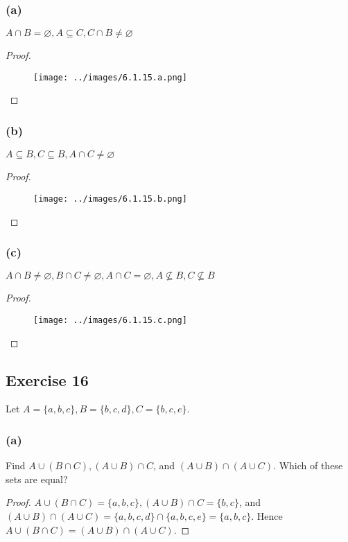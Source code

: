 \documentclass[14pt]{extarticle}
\newcommand{\es}{\varnothing}
\begin{document}
\subsubsection{(a)}
\(A \cap B = \es, A \subseteq C, C \cap B \neq \es\)

\begin{proof}
  \begin{figure}[ht!]
    \centering
    \texttt{[image: ../images/6.1.15.a.png]}
  \end{figure}
\end{proof}

\subsubsection{(b)}
\(A \subseteq B, C \subseteq B, A \cap C \neq \es\)

\begin{proof}
  \begin{figure}[ht!]
    \centering
    \texttt{[image: ../images/6.1.15.b.png]}
  \end{figure}
\end{proof}

\subsubsection{(c)}
\(A \cap B \neq \es, B \cap C \neq \es, A \cap C = \es, A \nsubseteq B, C \nsubseteq B\)

\begin{proof}
  \begin{figure}[ht!]
    \centering
    \texttt{[image: ../images/6.1.15.c.png]}
  \end{figure}
\end{proof}

\subsection{Exercise 16}
Let \(A = \{a, b, c\}, B = \{b, c, d\}, C = \{b, c, e\}\).

\subsubsection{(a)}
Find \(A \cup (B \cap C), (A \cup B) \cap C\), and \((A \cup B) \cap (A \cup C)\). Which of these sets are equal?

\begin{proof}
  \(A \cup (B \cap C ) = \{a, b, c\}, (A \cup B) \cap C =
  \{b, c\}\),
  and \((A \cup B) \cap (A \cup C ) = \{a, b, c, d\} \cap \{a, b, c, e\} = \{a, b, c\}\).
  Hence \(A \cup (B \cap C ) = (A \cup B) \cap (A \cup C).\)
\end{proof}
\end{document}
